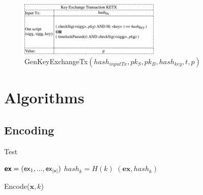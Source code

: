 \documentclass{cacthesis}
\begin{document}
        \begin{figure}
            \begin{center}
              \includegraphics[width=0.6\textwidth]{images/GenKeyExchangeTx.png}
              \caption{\textsf{GenKeyExchangeTx}$(hash_{inputTx}, pk_S, pk_B, hash_{key}, t, p)$}
              \label{fig:genKeyExchangeTx}
            \end{center}
        \end{figure}
        
        \section{Algorithms}
        
        \subsection{Encoding}
        Test
        \begin{center}
        \begin{minipage}[t]{3.15in}
            \begin{algorithm}[H]
                $\textsf{\textbf{ex}} = (\textsf{ex}_1,..., \textsf{ex}_{|\textsf{x}|})$\;
                $hash_k = H(k)$\;
                \Return $(\textbf{ex}, hash_k)$\;
                \caption{\textsf{Encode($\textbf{x}, k$)}}
            \end{algorithm}
        \end{minipage}    
        \end{center}
        
\end{document}
